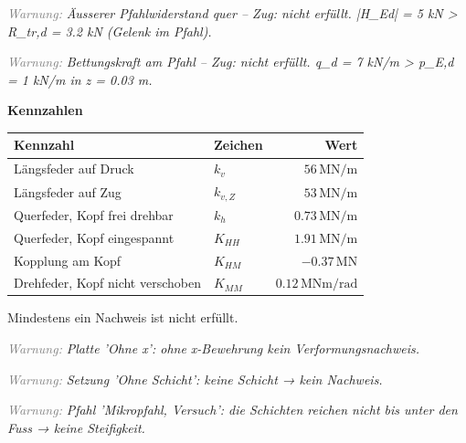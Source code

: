 \documentclass[11pt,a4paper]{article}
\newcommand{\hinweis}[2]{\par\noindent\textcolor{gray}{\textit{#1:}} \textit{#2}\par}
\begin{document}
\hinweis{Warnung}{Äusserer Pfahlwiderstand quer – Zug: nicht erfüllt. |H\_Ed| = 5 kN > R\_tr,d = 3.2 kN (Gelenk im Pfahl).}
\hinweis{Warnung}{Bettungskraft am Pfahl – Zug: nicht erfüllt. q\_d = 7 kN/m > p\_E,d = 1 kN/m in z = 0.03 m.}
\noindent\textbf{Kennzahlen}
\begin{longtable}{llr}
\hline
Kennzahl & Zeichen & Wert \\
\hline
\endhead
Längsfeder auf Druck & $k_v$ & $56\,\mathrm{MN}/\mathrm{m}$ \\
Längsfeder auf Zug & $k_{v,Z}$ & $53\,\mathrm{MN}/\mathrm{m}$ \\
Querfeder, Kopf frei drehbar & $k_h$ & $0.73\,\mathrm{MN}/\mathrm{m}$ \\
Querfeder, Kopf eingespannt & $K_{HH}$ & $1.91\,\mathrm{MN}/\mathrm{m}$ \\
Kopplung am Kopf & $K_{HM}$ & $-0.37\,\mathrm{MN}$ \\
Drehfeder, Kopf nicht verschoben & $K_{MM}$ & $0.12\,\mathrm{MNm}/\mathrm{rad}$ \\
\hline
\end{longtable}
Mindestens ein Nachweis ist nicht erfüllt.

\hinweis{Warnung}{Platte 'Ohne x': ohne x-Bewehrung kein Verformungsnachweis.}
\hinweis{Warnung}{Setzung 'Ohne Schicht': keine Schicht → kein Nachweis.}
\hinweis{Warnung}{Pfahl 'Mikropfahl, Versuch': die Schichten reichen nicht bis unter den Fuss → keine Steifigkeit.}
\end{document}

